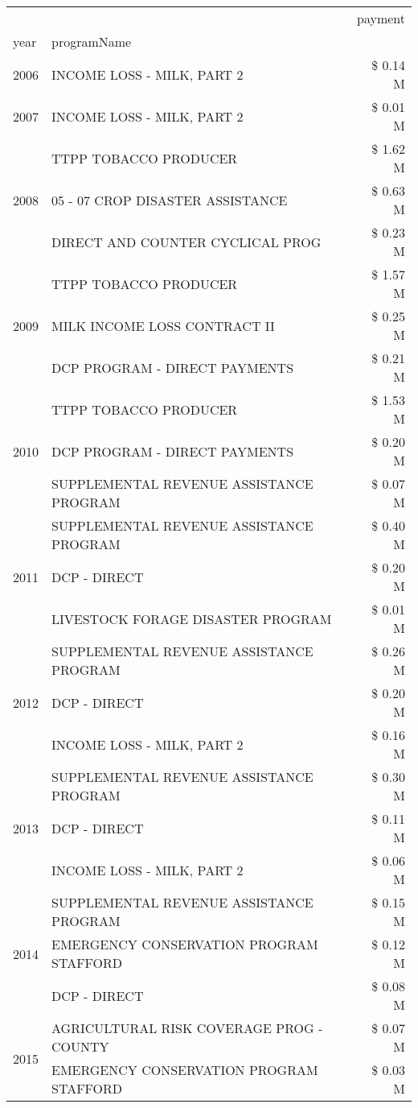 \begin{tabular}{llr}
\toprule
 &  & payment \\
year & programName &  \\
\midrule
2006 & INCOME LOSS - MILK, PART 2 & \$ 0.14 M \\
\cline{1-3}
2007 & INCOME LOSS - MILK, PART 2 & \$ 0.01 M \\
\cline{1-3}
\multirow[t]{3}{*}{2008} & TTPP TOBACCO PRODUCER & \$ 1.62 M \\
 & 05 - 07 CROP DISASTER ASSISTANCE & \$ 0.63 M \\
 & DIRECT AND COUNTER CYCLICAL PROG & \$ 0.23 M \\
\cline{1-3}
\multirow[t]{3}{*}{2009} & TTPP TOBACCO PRODUCER & \$ 1.57 M \\
 & MILK INCOME LOSS CONTRACT II & \$ 0.25 M \\
 & DCP PROGRAM - DIRECT PAYMENTS & \$ 0.21 M \\
\cline{1-3}
\multirow[t]{3}{*}{2010} & TTPP TOBACCO PRODUCER & \$ 1.53 M \\
 & DCP PROGRAM - DIRECT PAYMENTS & \$ 0.20 M \\
 & SUPPLEMENTAL REVENUE ASSISTANCE PROGRAM & \$ 0.07 M \\
\cline{1-3}
\multirow[t]{3}{*}{2011} & SUPPLEMENTAL REVENUE ASSISTANCE PROGRAM & \$ 0.40 M \\
 & DCP - DIRECT & \$ 0.20 M \\
 & LIVESTOCK FORAGE DISASTER PROGRAM & \$ 0.01 M \\
\cline{1-3}
\multirow[t]{3}{*}{2012} & SUPPLEMENTAL REVENUE ASSISTANCE PROGRAM & \$ 0.26 M \\
 & DCP - DIRECT & \$ 0.20 M \\
 & INCOME LOSS - MILK, PART 2 & \$ 0.16 M \\
\cline{1-3}
\multirow[t]{3}{*}{2013} & SUPPLEMENTAL REVENUE ASSISTANCE PROGRAM & \$ 0.30 M \\
 & DCP - DIRECT & \$ 0.11 M \\
 & INCOME LOSS - MILK, PART 2 & \$ 0.06 M \\
\cline{1-3}
\multirow[t]{3}{*}{2014} & SUPPLEMENTAL REVENUE ASSISTANCE PROGRAM & \$ 0.15 M \\
 & EMERGENCY CONSERVATION PROGRAM STAFFORD & \$ 0.12 M \\
 & DCP - DIRECT & \$ 0.08 M \\
\cline{1-3}
\multirow[t]{3}{*}{2015} & AGRICULTURAL RISK COVERAGE PROG - COUNTY & \$ 0.07 M \\
 & EMERGENCY CONSERVATION PROGRAM STAFFORD & \$ 0.03 M \\

\end{tabular}
